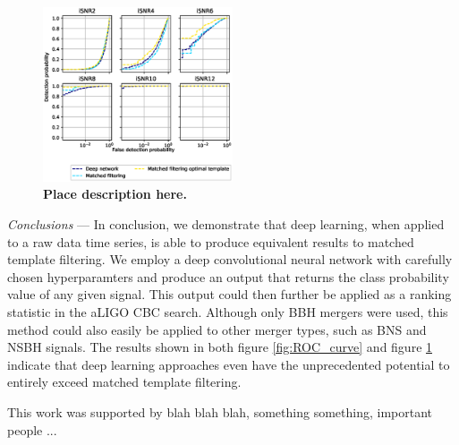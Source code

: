 \documentclass[%
 amsmath,amssymb,
 aps,
 twocolumn,
 prl,
 reprint,
floatfix,
]{revtex4-1}
\begin{document}
\begin{figure}[]
 \includegraphics[width=0.5\textwidth]
 {figures/ROC_curves.eps}
 \caption{\label{fig:isnr_curves} \textbf{Place description here.}}
\end{figure}

\textit{Conclusions} --- In conclusion, we demonstrate that deep learning, when applied to a raw data time series, is able to produce equivalent results to matched template filtering. We employ a deep convolutional neural network with carefully chosen hyperparamters and produce an output that returns the class probability value of any given signal. This output could then further be applied as a ranking statistic in the aLIGO CBC search. Although only BBH mergers were used, this method could also easily be applied to other merger types, such as BNS and NSBH signals. The results shown in both figure \ref{fig:ROC_curve} and figure \ref{fig:isnr_curves} indicate that deep learning approaches even have the unprecedented potential to entirely exceed matched template filtering. 

This work was supported by blah blah blah, something something, important people ... 





\end{document}
